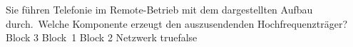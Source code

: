     {Sie führen Telefonie im Remote-Betrieb mit dem dargestellten Aufbau durch. Welche Komponente erzeugt den auszusendenden Hochfrequenzträger?}
    {Block 3}
    {Block 1}
    {Block 2}
    {Netzwerk}
    {true}{false}
